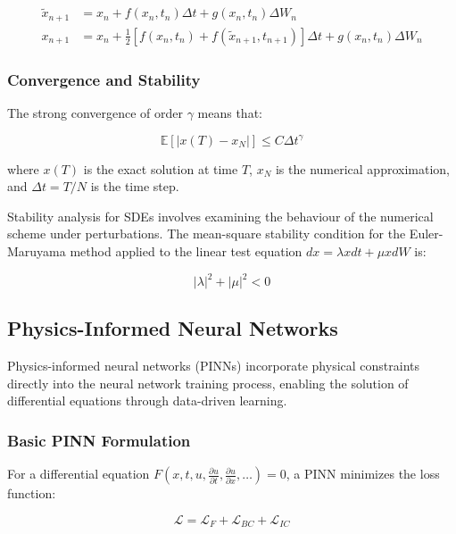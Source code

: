 \begin{align}
\tilde{x}_{n+1} &= x_n + f(x_n, t_n) \Delta t + g(x_n, t_n) \Delta W_n \\
x_{n+1} &= x_n + \frac{1}{2}[f(x_n, t_n) + f(\tilde{x}_{n+1}, t_{n+1})] \Delta t + g(x_n, t_n) \Delta W_n
\end{align}

\subsubsection{Convergence and Stability}

The strong convergence of order $\gamma$ means that:

\begin{equation}
\mathbb{E}[|x(T) - x_N|] \leq C \Delta t^{\gamma}
\end{equation}

where $x(T)$ is the exact solution at time $T$, $x_N$ is the numerical approximation, and $\Delta t = T/N$ is the time step.

Stability analysis for SDEs involves examining the behaviour of the numerical scheme under perturbations. The mean-square stability condition for the Euler-Maruyama method applied to the linear test equation $dx = \lambda x dt + \mu x dW$ is:

\begin{equation}
|\lambda|^2 + |\mu|^2 < 0
\end{equation}

\subsection{Physics-Informed Neural Networks}

Physics-informed neural networks (PINNs) incorporate physical constraints directly into the neural network training process, enabling the solution of differential equations through data-driven learning.

\subsubsection{Basic PINN Formulation}

For a differential equation $F(x, t, u, \frac{\partial u}{\partial t}, \frac{\partial u}{\partial x}, \ldots) = 0$, a PINN minimizes the loss function:

\begin{equation}
\mathcal{L} = \mathcal{L}_F + \mathcal{L}_{BC} + \mathcal{L}_{IC}
\end{equation}

